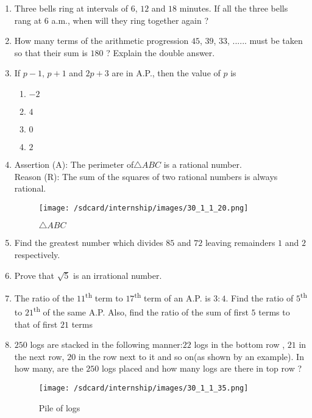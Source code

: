 \documentclass[12pt]{article}
\begin{document}
\begin{enumerate}
        \item Three bells ring at intervals of $6$, $12$ and $18$ minutes. If all the three bells rang at $6$ a.m., when will they ring together again ?
    \item How many terms of the arithmetic progression $45$, $39$, $33$, ...... must be taken so that their sum is $180$ ? Explain the double answer.
    \item If $p-1$, $p+1$ and $2p+3$ are in A.P., then the value of $p$ is
        \begin{enumerate}[label=(\alph*)]
      \item $-2$
      \item $4$
      \item $0$
      \item $2$
      \end{enumerate}
    \item Assertion (A):  The perimeter of$\triangle ABC$ is a rational number.\\Reason (R): The sum of the squares of two rational numbers is always rational.
    \begin{figure}[H]
        \centering
        \texttt{[image: /sdcard/internship/images/30\_1\_1\_20.png]}
        \caption{$\triangle ABC$}
        \label{fig:figure1}
    \end{figure}
    \item Find the greatest number which divides $85$ and $72$ leaving remainders $1$ and $2$ respectively.
    \item Prove that $\sqrt{5}$ is an irrational number.
        \item The ratio of the $11$\textsuperscript{th} term to $17$\textsuperscript{th} term of an A.P. is $3:4$. Find the ratio of $5$\textsuperscript{th} to $21$\textsuperscript{th} of the same A.P. Also, find the ratio of the sum of first $5$ terms to that of first $21$ terms
        \item $250$ logs are stacked in the following manner:\newline $22$ logs in the bottom row , $21$ in the next row, $20$ in the row next to it and so on(as shown by an example). In how many, are the $250$ logs placed and how many logs are there in top row ?
         \begin{figure}[H]
             \centering
             \texttt{[image: /sdcard/internship/images/30\_1\_1\_35.png]}
             \caption{Pile of logs}
             \label{fig:figure2}
         \end{figure}
\end{enumerate}
\end{document}
